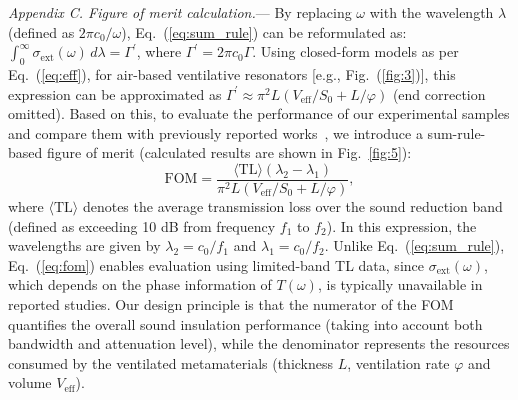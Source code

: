 \documentclass[final,5p,times,twocolumn]{elsarticle}
\begin{document}
\textit{Appendix C. Figure of merit calculation.}— By replacing $\omega$ with the wavelength $\lambda$ (defined as $2\pi c_0/\omega$), Eq.~(\ref{eq:sum_rule}) can be reformulated as: $\int_0^{\infty} \sigma_\mathrm{ext}(\omega) \, d\lambda = \Gamma^{\prime}$, where $\Gamma^{\prime} = 2\pi c_0 \Gamma$. Using closed-form models as per Eq.~(\ref{eq:eff}), for air-based ventilative resonators [e.g., Fig.~(\ref{fig:3})], this expression can be approximated as $\Gamma^{\prime} \approx \pi^2 L \left(V_\mathrm{eff}/S_0 + L/\varphi \right)$ (end correction omitted). Based on this, to evaluate the performance of our experimental samples and compare them with previously reported works~\cite{wang2023meta,nguyen2020broadband,jia2025acoustic,lu2025ultra,mei2025reconfigurable,dong2021ultrabroadband,xu2024broadband,fu2025ultrabroadband,jimenez2017rainbow}, we introduce a sum-rule-based figure of merit (calculated results are shown in Fig.~\ref{fig:5}):
\begin{equation} \label{eq:fom}
	\mathrm{FOM} = \frac{\langle\mathrm{TL}\rangle \left(\lambda_2 - \lambda_1\right)}{\pi^2 L \left(V_\mathrm{eff}/S_0 + L/\varphi \right)},
\end{equation}
where $\langle\mathrm{TL}\rangle$ denotes the average transmission loss over the sound reduction band (defined as exceeding 10 dB from frequency $f_1$ to $f_2$). In this expression, the wavelengths are given by $\lambda_2 = c_0/f_1$ and $\lambda_1 = c_0/f_2$. Unlike Eq.~(\ref{eq:sum_rule}), Eq.~(\ref{eq:fom}) enables evaluation using limited-band TL data, since $\sigma_\mathrm{ext}(\omega)$, which depends on the phase information of $T(\omega)$, is typically unavailable in reported studies. Our design principle is that the numerator of the FOM quantifies the overall sound insulation performance (taking into account both bandwidth and attenuation level), while the denominator represents the resources consumed by the ventilated metamaterials (thickness $L$, ventilation rate $\varphi$ and volume $V_\mathrm{eff}$).
\end{document}
